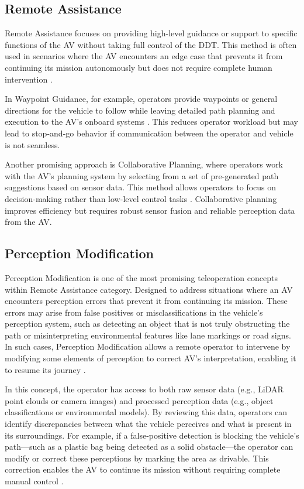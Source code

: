 \subsection{Remote Assistance}
Remote Assistance focuses on providing high-level guidance or support
to specific functions of the AV without taking full control of the DDT.
This method is often used in scenarios where the AV encounters an
edge case that prevents it from continuing its mission autonomously
but does not require complete human intervention \cite{Brecht}.

In Waypoint Guidance, for example, operators provide waypoints or general
directions for the vehicle to follow while leaving detailed path planning
and execution to the AV's onboard systems \cite{corridor}. This reduces
operator workload but may lead to stop-and-go behavior if communication
between the operator and vehicle is not seamless.

Another promising approach is Collaborative Planning, where operators
work with the AV's planning system by selecting from a set of pre-generated
path suggestions based on sensor data. This method allows operators to focus
on decision-making rather than low-level control tasks \cite{hosseini2024collaborative}.
Collaborative planning improves efficiency but requires robust sensor fusion and reliable
perception data from the AV.
\subsection{Perception Modification}

Perception Modification is one of the most promising teleoperation
concepts within Remote Assistance category. Designed to address situations where an \ac{AV}
encounters perception errors that prevent it
from continuing its mission. These errors may arise from false
positives or misclassifications in the vehicle's perception system,
such as detecting an object that is not truly obstructing the path or
misinterpreting environmental features like lane markings or road signs.
In such cases, Perception Modification allows a remote operator to
intervene by modifying some elements of perception to correct \ac{AV}'s interpretation,
enabling it to resume its journey \cite{Feiler2021ThePM,feiler2023perception}.

In this concept, the operator has access to both raw sensor data
(e.g., LiDAR point clouds or camera images) and processed perception
data (e.g., object classifications or environmental models).
By reviewing this data, operators can identify discrepancies
between what the vehicle perceives and what is present in its
surroundings. For example, if a false-positive detection is blocking
the vehicle's path—such as a plastic bag being detected as a solid
obstacle—the operator can modify or correct these perceptions by
marking the area as drivable. This correction enables the AV to
continue its mission without requiring complete manual control \cite{feiler2023perception}.

